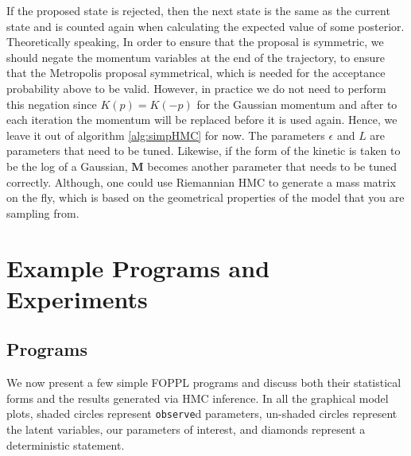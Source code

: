 \documentclass[twoside]{article}
\begin{document}
If the proposed state is rejected, then the next state is the same as the current state and is counted again when calculating the expected value of some posterior. 
Theoretically speaking, In order to ensure that the proposal is symmetric, we should negate the momentum variables at the end of the trajectory, to ensure that the Metropolis proposal symmetrical, which is needed for the acceptance probability above to be valid. However, in practice we do not need to perform this negation since $K(p) = K(-p)$ for the Gaussian momentum and after to each iteration the momentum will be replaced before it is used again. Hence, we leave it out of algorithm \ref{alg:simpHMC} for now. 
The parameters  $\epsilon$ and $L$ are parameters that need to be tuned. Likewise, if the form of the kinetic is taken to be the log of a Gaussian, $\textbf{M}$ becomes another parameter that needs to be tuned correctly. Although, one could use Riemannian HMC \citep{girolami2011riemann} to generate a mass matrix on the fly, which is based on the geometrical properties of the model that you are sampling from.

\section{Example Programs and Experiments}
\label{sec:exampprog}
\subsection{Programs}

We now present a few simple FOPPL programs and discuss both their statistical forms and the results generated via HMC inference. In all the graphical model plots, shaded circles represent \texttt{observe}d parameters, un-shaded circles represent the latent variables, our parameters of interest, and diamonds represent a deterministic statement. 
\end{document}

